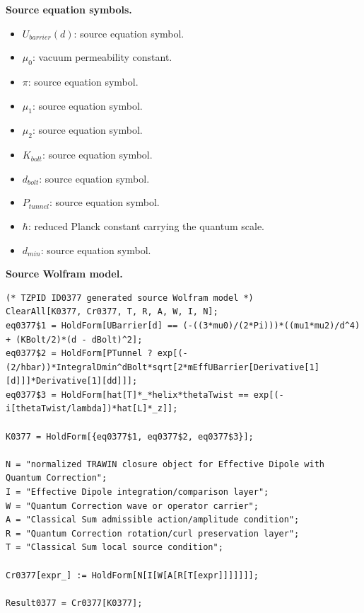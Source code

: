 \begin{minipage}[t]{0.49\linewidth}
\begingroup
\small
\raggedright
\textbf{Source equation symbols.}\par
\begin{itemize}[leftmargin=1.35em,itemsep=1pt,topsep=1pt,parsep=0pt]
    \item $U_{barrier}(d)$: source equation symbol.
    \item $\mu_0$: vacuum permeability constant.
    \item $\pi$: source equation symbol.
    \item $\mu_1$: source equation symbol.
    \item $\mu_2$: source equation symbol.
    \item $K_{bolt}$: source equation symbol.
    \item $d_{bolt}$: source equation symbol.
    \item $P_{tunnel}$: source equation symbol.
    \item $\hbar$: reduced Planck constant carrying the quantum scale.
    \item $d_{min}$: source equation symbol.
\end{itemize}
\endgroup
\end{minipage}\hfill
\begin{minipage}[t]{0.47\linewidth}
\begingroup
\scriptsize
\raggedright
\textbf{Source Wolfram model.}\par
\begin{Verbatim}[fontsize=\tiny,breaklines=true,breakanywhere=true]
(* TZPID ID0377 generated source Wolfram model *)
ClearAll[K0377, Cr0377, T, R, A, W, I, N];
eq0377$1 = HoldForm[UBarrier[d] == (-((3*mu0)/(2*Pi)))*((mu1*mu2)/d^4) + (KBolt/2)*(d - dBolt)^2];
eq0377$2 = HoldForm[PTunnel ? exp[(-(2/hbar))*IntegralDmin^dBolt*sqrt[2*mEffUBarrier[Derivative[1][d]]]*Derivative[1][dd]]];
eq0377$3 = HoldForm[hat[T]*_*helix*thetaTwist == exp[(-i[thetaTwist/lambda])*hat[L]*_z]];

K0377 = HoldForm[{eq0377$1, eq0377$2, eq0377$3}];

N = "normalized TRAWIN closure object for Effective Dipole with Quantum Correction";
I = "Effective Dipole integration/comparison layer";
W = "Quantum Correction wave or operator carrier";
A = "Classical Sum admissible action/amplitude condition";
R = "Quantum Correction rotation/curl preservation layer";
T = "Classical Sum local source condition";

Cr0377[expr_] := HoldForm[N[I[W[A[R[T[expr]]]]]]];

Result0377 = Cr0377[K0377];
\end{Verbatim}
\endgroup
\end{minipage}

